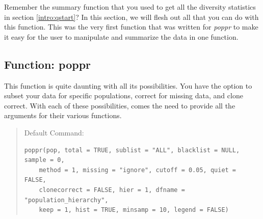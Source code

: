 \documentclass[letterpaper]{article}\usepackage[]{graphicx}\usepackage[]{color}
\makeatletter
\newenvironment{kframe}{%
 \def\at@end@of@kframe{}%
 \ifinner\ifhmode%
  \def\at@end@of@kframe{\end{minipage}}%
  \begin{minipage}{\columnwidth}%
 \fi\fi%
 \def\FrameCommand##1{\hskip\@totalleftmargin \hskip-\fboxsep
 \colorbox{shadecolor}{##1}\hskip-\fboxsep
     \hskip-\linewidth \hskip-\@totalleftmargin \hskip\columnwidth}%
 \MakeFramed {\advance\hsize-\width
   \@totalleftmargin\z@ \linewidth\hsize
   \@setminipage}}%
 {\par\unskip\endMakeFramed%
 \at@end@of@kframe}
\newenvironment{knitrout}{}{} %
\newcommand{\tab}{\hspace*{1em}}
\makeatother
\begin{document}
\tab\tab Remember the summary function that you used to get all the diversity statistics in section \ref{intro:qstart}? In this section, we will flesh out all that you can do with this function. This was the very first function that was written for \textit{poppr} to make it easy for the user to manipulate and summarize the data in one function.
\subsection{Function: poppr}\label{summary:poppr}

\tab\tab This function is quite daunting with all its possibilities. You have the option to subset your data for specific populations, correct for missing data, and clone correct. With each of these possibilities, comes the need to provide all the arguments for their various functions.
\begin{quote}
Default Command:
\begin{knitrout}
\color{fgcolor}\begin{kframe}
\begin{verbatim}
poppr(pop, total = TRUE, sublist = "ALL", blacklist = NULL, sample = 0, 
    method = 1, missing = "ignore", cutoff = 0.05, quiet = FALSE, 
    clonecorrect = FALSE, hier = 1, dfname = "population_hierarchy", 
    keep = 1, hist = TRUE, minsamp = 10, legend = FALSE)
\end{verbatim}
\end{kframe}
\end{knitrout}

\end{quote}
\end{document}
